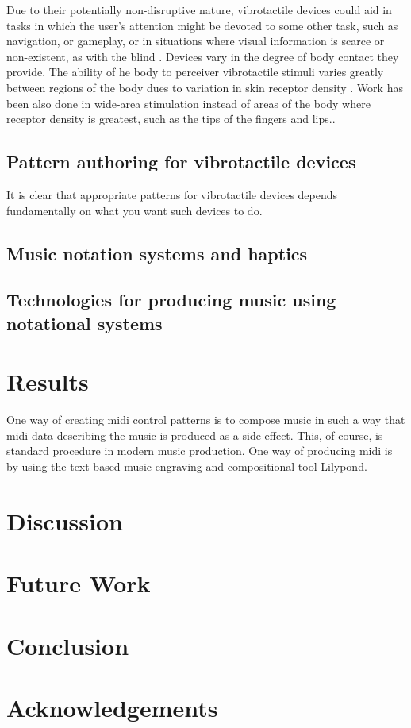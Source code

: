 \documentclass[a4paper, twocolumn]{article}
\begin{document}
Due to their potentially non-disruptive nature, vibrotactile devices could aid in tasks in which the user's attention might be devoted to some other task, such as navigation, or gameplay, or in situations where visual information is scarce or non-existent, as with the blind \cite{ertan1998wearable}.  Devices vary in the degree of body contact they provide. The ability of he body to perceiver vibrotactile stimuli varies greatly between regions of the body dues to variation in skin receptor density \cite{lindeman2006wearable}. Work has been also done in wide-area stimulation instead of areas of the body where receptor density is greatest, such as the tips of the fingers and lips.\cite{lindeman2004towards}.

\subsection{Pattern authoring for vibrotactile devices}
It is clear that appropriate patterns for vibrotactile devices depends fundamentally on what you want such devices to do.



\subsection{Music notation systems and haptics}
\subsection{Technologies for producing music using notational systems}

\section{Results}


One way of creating midi control patterns is to compose music in such a way that midi data describing the music is produced as a side-effect. This, of course, is standard procedure in modern music production. One way of producing midi is by using the text-based music engraving and compositional tool Lilypond.
\section{Discussion}
\section{Future Work}
\section{Conclusion}
\section{Acknowledgements}




  
\end{document}
